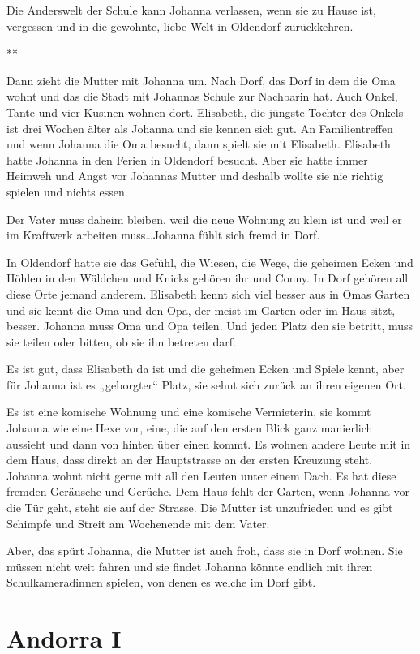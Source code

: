 \documentclass[10pt,titlepage,a5paper]{book}
\newcommand{\sterne}{\par{\centering ***\par}}
\begin{document}
Die Anderswelt der Schule kann Johanna verlassen, wenn sie zu Hause ist, vergessen und in die gewohnte, liebe Welt in Oldendorf  zurückkehren.


\sterne


Dann zieht die Mutter mit Johanna um. Nach Dorf, das Dorf in dem die Oma wohnt und das die Stadt mit Johannas Schule zur Nachbarin hat. Auch Onkel, Tante und vier Kusinen wohnen dort. Elisabeth, die jüngste Tochter des Onkels ist drei Wochen älter als Johanna und sie kennen sich gut. An Familientreffen und wenn Johanna die Oma besucht, dann spielt sie mit Elisabeth. Elisabeth hatte Johanna in den Ferien in Oldendorf besucht. Aber sie hatte immer Heimweh und Angst vor Johannas Mutter und deshalb wollte sie nie richtig spielen und nichts essen.

Der Vater muss daheim bleiben, weil die neue Wohnung zu klein ist und weil er im Kraftwerk arbeiten muss\dots Johanna fühlt sich fremd in Dorf.

In Oldendorf hatte sie das Gefühl, die Wiesen, die Wege, die geheimen Ecken und Höhlen in den Wäldchen und Knicks gehören ihr und Conny. In Dorf gehören all diese Orte jemand anderem. Elisabeth kennt sich viel besser aus in Omas Garten und sie kennt die Oma und den Opa, der meist im Garten oder im Haus sitzt, besser. Johanna muss Oma und Opa teilen. Und jeden Platz den sie betritt, muss sie teilen oder bitten, ob sie ihn betreten darf.

Es ist gut, dass Elisabeth da ist und die geheimen Ecken und Spiele kennt, aber für Johanna ist es „geborgter“ Platz, sie sehnt sich zurück an ihren eigenen Ort.

Es ist eine komische Wohnung und eine komische Vermieterin, sie kommt Johanna wie eine Hexe vor, eine, die auf den ersten Blick ganz manierlich aussieht und dann von hinten über einen kommt. Es wohnen andere Leute mit in dem Haus, dass direkt an der Hauptstrasse an der ersten Kreuzung steht. Johanna wohnt nicht gerne mit all den Leuten unter einem Dach. Es hat diese fremden Geräusche und Gerüche. Dem Haus fehlt der Garten, wenn Johanna vor die Tür geht, steht sie auf der Strasse. Die Mutter ist unzufrieden und es gibt Schimpfe und Streit am Wochenende mit dem Vater. 

Aber, das spürt Johanna, die Mutter ist auch froh, dass sie in Dorf wohnen. Sie müssen nicht weit fahren und sie findet Johanna könnte endlich mit ihren Schulkameradinnen spielen, von denen es welche im Dorf gibt. 


\section*{Andorra I}
\end{document}
